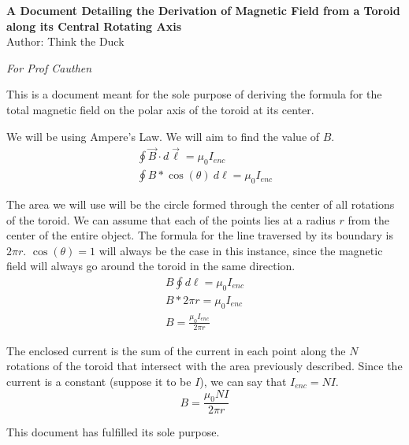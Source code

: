 \documentclass[12pt]{article}
\begin{document}
    \begin{center}
        \textbf{A Document Detailing the Derivation of Magnetic Field from a Toroid along its Central Rotating Axis}\\
        Author: Think the Duck
    \end{center}
    \textit{For Prof Cauthen}

    This is a document meant for the sole purpose of deriving the formula for the total magnetic field on the polar axis of the toroid at its center.

    We will be using Ampere's Law.
    We will aim to find the value of $B$.
    \begin{gather}
        \oint \vec{B} \cdot d\vec\ell = \mu_0 I_{enc}\\
        \oint B * \cos(\theta)\ d\ell = \mu_0 I_{enc}
    \end{gather}

    The area we will use will be the circle formed through the center of all rotations of the toroid.
    We can assume that each of the points lies at a radius $r$ from the center of the entire object.
    The formula for the line traversed by its boundary is $2\pi r$.
    $\cos(\theta) = 1$ will always be the case in this instance, since the magnetic field will always go around the toroid in the same direction.
    \begin{gather}
        B \oint d\ell = \mu_0 I_{enc}\\
        B * 2\pi r = \mu_0 I_{enc}\\
        B = \frac{\mu_0 I_{enc}}{2\pi r}
    \end{gather}

    The enclosed current is the sum of the current in each point along the $N$ rotations of the toroid that intersect with the area previously described.
    Since the current is a constant (suppose it to be $I$), we can say that $I_{enc} = NI$.
    \begin{equation}
        B = \frac{\mu_0 NI}{2\pi r}
    \end{equation}

    This document has fulfilled its sole purpose.
\end{document}
